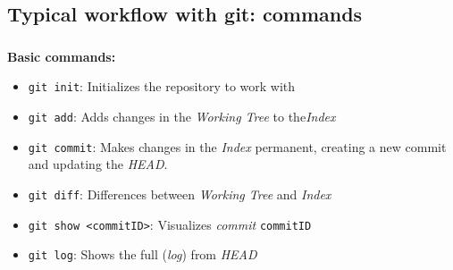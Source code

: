 
\subsection{Typical workflow with git: commands}

\begin{frame}
  \frametitle{\insertsubsection}

  \textbf{Basic commands:}
  \begin{itemize}

  \item \texttt{git init}: Initializes the repository to work with
    \git \vspacing

  \item \texttt{git add}: Adds changes in the \textit{Working Tree} to
    the\textit{Index}
    \vspacing

  \item \texttt{git commit}: Makes changes in the \textit{Index}
    permanent, creating a new commit and updating the \textit{HEAD}.
    \vspacing

  \item \texttt{git diff}: Differences between \textit{Working Tree} and
    \textit{Index}
    \vspacing

  \item \texttt{git show <commitID>}: Visualizes \textit{commit}
    \texttt{commitID} \vspacing

  \item \texttt{git log}: Shows the full (\textit{log}) from
    \textit{HEAD} \vspacing
  \end{itemize}
\end{frame}

